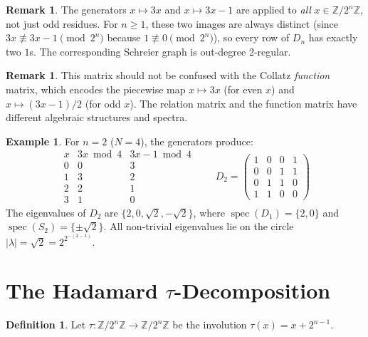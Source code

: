 \documentclass[11pt,reqno]{amsart}
\theoremstyle{definition}
\newtheorem{definition}[theorem]{Definition}
\newtheorem{remark}[theorem]{Remark}
\newtheorem{example}[theorem]{Example}
\begin{document}
\begin{remark}
The generators $x \mapsto 3x$ and $x \mapsto 3x - 1$ are applied to \emph{all} $x \in \mathbb{Z}/2^n\mathbb{Z}$, not just odd residues. For $n \ge 1$, these two images are always distinct (since $3x \not\equiv 3x - 1 \pmod{2^n}$ because $1 \not\equiv 0 \pmod{2^n}$), so every row of $D_n$ has exactly two $1$s. The corresponding Schreier graph is out-degree 2-regular.
\end{remark}

\begin{remark}
This matrix should not be confused with the Collatz \emph{function} matrix, which encodes the piecewise map $x \mapsto 3x$ (for even $x$) and $x \mapsto (3x-1)/2$ (for odd $x$). The relation matrix and the function matrix have different algebraic structures and spectra.
\end{remark}

\begin{example}
For $n = 2$ ($N = 4$), the generators produce:
\[
\begin{array}{c|cc}
x & 3x \bmod 4 & 3x-1 \bmod 4 \\ \hline
0 & 0 & 3 \\
1 & 3 & 2 \\
2 & 2 & 1 \\
3 & 1 & 0
\end{array}
\qquad
D_2 = \begin{pmatrix} 1 & 0 & 0 & 1 \\ 0 & 0 & 1 & 1 \\ 0 & 1 & 1 & 0 \\ 1 & 1 & 0 & 0 \end{pmatrix}
\]
The eigenvalues of $D_2$ are $\{2, 0, \sqrt{2}, -\sqrt{2}\}$, where $\operatorname{spec}(D_1) = \{2, 0\}$ and $\operatorname{spec}(S_2) = \{\pm\sqrt{2}\}$. All non-trivial eigenvalues lie on the circle $|\lambda| = \sqrt{2} = 2^{2^{-(2-1)}}$.
\end{example}

\section{The Hadamard $\tau$-Decomposition}\label{sec:hadamard}

\begin{definition}
Let $\tau \colon \mathbb{Z}/2^n\mathbb{Z} \to \mathbb{Z}/2^n\mathbb{Z}$ be the involution $\tau(x) = x + 2^{n-1}$.
\end{definition}
\end{document}
